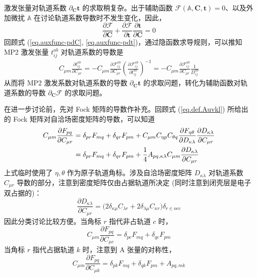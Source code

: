 激发张量对轨道系数 $\partial_\mathbf{C} \mathbf{t}$ 的求取稍复杂。出于辅助函数 $\pmb{\mathscr{F}} (\mathbb{A}, \mathbf{C}, \mathbf{t}) = 0$、以及外加微扰 $\mathbb{A}$ 在讨论轨道系数导数时不发生变化，因此，
\begin{equation}
  \label{eq.auxfunc-pdC}
  \frac{\partial \pmb{\mathscr{F}}}{\partial \mathbf{C}} + \frac{\partial \pmb{\mathscr{F}}}{\partial \mathbf{t}} \frac{\partial \mathbf{t}}{\partial \mathbf{C}} = 0
\end{equation}
回顾式 (\ref{eq.auxfunc-pdC}, \ref{eq.auxfunc-pdt})，通过隐函数求导规则，可以推知 MP2 激发张量 $t_{ij}^{ab}$ 对轨道系数的导数是
\begin{align}
  \label{eq.relation-tpdc-fpdc}
  C_{\mu m} \frac{\partial t_{ij}^{ab}}{\partial C_{\mu r}}
  = - C_{\mu m} \frac{\partial \mathscr{F}_{ij}^{ab}}{\partial C_{\mu r}} \left( \frac{\partial \mathscr{F}_{ij}^{ab}}{\partial t_{ij}^{ab}} \right)^{-1}
  = - C_{\mu m} \frac{\partial \mathscr{F}_{ij}^{ab}}{\partial C_{\mu r}} \frac{1}{D_{ij}^{ab}}
\end{align}
从而将 MP2 激发系数对轨道系数的导数 $\partial_\mathbf{C} \mathbf{t}$ 的求取问题，转化为辅助函数对轨道系数的导数 $\partial_\mathbf{C} \pmb{\mathscr{F}}$ 的求取问题。

在进一步讨论前，先对 Fock 矩阵的导数作补充。回顾式 (\ref{eq.def.Auvkl}) 所给出的 Fock 矩阵对自洽场密度矩阵的导数，可以知道
\begin{align}
  C_{\mu m} \frac{\partial F_{pq}}{\partial C_{\mu r}} &= \delta_{pr} F_{mq} + \delta_{qr} F_{pm} + C_{\mu m} C_{\eta p} C_{\theta q} \frac{\partial F_{\eta \theta}}{\partial D_{\kappa \lambda}} \frac{\partial D_{\kappa \lambda}}{\partial C_{\mu r}} \notag\\
  &= \delta_{pr} F_{mq} + \delta_{qr} F_{pm} + \frac{1}{4} A_{pq, \kappa \lambda} C_{\mu m} \frac{\partial D_{\kappa \lambda}}{\partial C_{\mu r}}
\end{align}
上式临时使用了 $\eta, \theta$ 作为原子轨道角标。涉及自洽场密度矩阵 $D_{\kappa \lambda}$ 对轨道系数 $C_{\mu r}$ 导数的部分，注意到密度矩阵仅由占据轨道所决定 (同时注意到闭壳层是电子双占据的)：
\begin{equation}
  \frac{\partial D_{\kappa \lambda}}{\partial C_{\mu r}} = \big( 2 \delta_{\kappa \mu} C_{\lambda r} + 2 \delta_{\lambda \mu} C_{\kappa r} \big) \delta_{r \in \mathrm{occ}}
\end{equation}
因此分类讨论比较方便。当角标 $r$ 指代非占轨道 $c$ 时，
\begin{equation}
  C_{\mu m} \frac{\partial F_{pq}}{\partial C_{\mu c}} = \delta_{pc} F_{mq} + \delta_{qc} F_{pm}
\end{equation}
当角标 $r$ 指代占据轨道 $k$ 时，注意到 A 张量的对称性，
\begin{equation}
  C_{\mu m} \frac{\partial F_{pq}}{\partial C_{\mu k}} = \delta_{pk} F_{mq} + \delta_{qk} F_{pm} + A_{pq, mk}
\end{equation}

